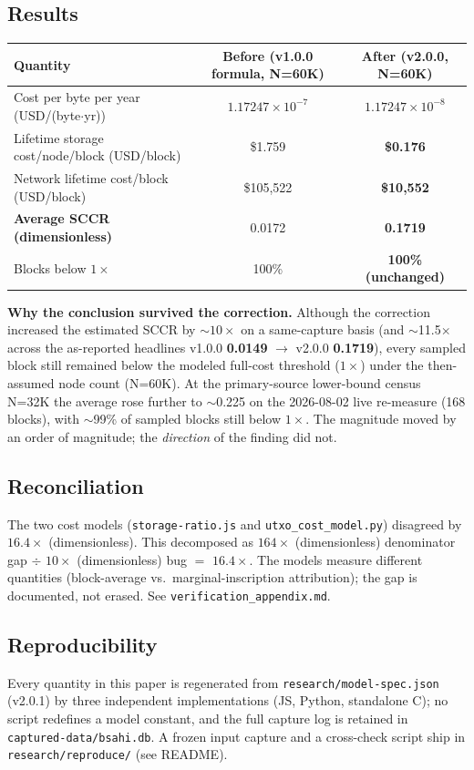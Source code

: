 \documentclass[11pt]{article}
\begin{document}
\subsection{Results}\label{sec:6.3}
\begin{center}
\renewcommand{\arraystretch}{1.2}
\begin{tabular}{lcc}
\toprule
Quantity & Before (v1.0.0 formula, N=60K) & After (v2.0.0, N=60K) \\
\midrule
Cost per byte per year (USD/(byte$\cdot$yr)) & $1.17247\times10^{-7}$ & \textbf{$1.17247\times10^{-8}$} \\
Lifetime storage cost/node/block (USD/block) & \$1.759 & \textbf{\$0.176} \\
Network lifetime cost/block (USD/block) & \$105{,}522 & \textbf{\$10{,}552} \\
\textbf{Average SCCR (dimensionless)} & 0.0172 & \textbf{0.1719} \\
Blocks below $1\times$ & 100\% & \textbf{100\% (unchanged)} \\
\bottomrule
\end{tabular}
\end{center}
\textbf{Why the conclusion survived the correction.} Although the correction increased the estimated SCCR by $\sim10\times$ on a same-capture basis (and $\sim$11.5$\times$ across the as-reported headlines v1.0.0 \textbf{0.0149} $\rightarrow$ v2.0.0 \textbf{0.1719}), every sampled block still remained below the modeled full-cost threshold ($1\times$) under the then-assumed node count (N=60K). At the primary-source lower-bound census N=32K the average rose further to $\sim$0.225 on the 2026-08-02 live re-measure (168 blocks), with $\sim$99\% of sampled blocks still below $1\times$. The magnitude moved by an order of magnitude; the \emph{direction} of the finding did not.

\subsection{Reconciliation}\label{sec:6.4}
The two cost models (\texttt{storage-ratio.js} and \texttt{utxo\_cost\_model.py}) disagreed by $16.4\times$ (dimensionless). This decomposed as $164\times$ (dimensionless) denominator gap $\div$ $10\times$ (dimensionless) bug $=$ $16.4\times$. The models measure different quantities (block-average vs.\ marginal-inscription attribution); the gap is documented, not erased. See \texttt{verification\_appendix.md}.

\subsection{Reproducibility}\label{sec:6.5}
Every quantity in this paper is regenerated from \texttt{research/model-spec.json} (v2.0.1) by three independent implementations (JS, Python, standalone C); no script redefines a model constant, and the full capture log is retained in \texttt{captured-data/bsahi.db}. A frozen input capture and a cross-check script ship in \texttt{research/reproduce/} (see README).
\end{document}
